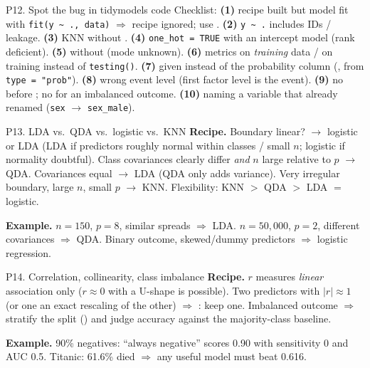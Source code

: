 \begin{topic}{P12. Spot the bug in tidymodels code }
Checklist: \textbf{(1)} recipe built but model fit with \texttt{fit(y \textasciitilde{} ., data)} $\Rightarrow$ recipe ignored;
use  \pipe{}  \pipe{} . \textbf{(2)} \texttt{y \textasciitilde{} .} includes IDs /
leakage. \textbf{(3)} KNN without . \textbf{(4)} \texttt{one\_hot = TRUE} with an intercept model
(rank deficient). \textbf{(5)}  without  (mode unknown). \textbf{(6)} metrics
on \emph{training} data /  on training instead of \texttt{testing()}. \textbf{(7)} 
given  instead of the probability column (, from \texttt{type = "prob"}).
\textbf{(8)} wrong event level (first factor level is the event). \textbf{(9)} no  before
; no  for an imbalanced outcome. \textbf{(10)}  naming a
variable that  already renamed (\texttt{sex} $\to$ \texttt{sex\_male}).
\end{topic}

\begin{topic}{P13. LDA vs.\ QDA vs.\ logistic vs.\ KNN }
\textbf{Recipe.} Boundary linear? $\to$ logistic or LDA (LDA if predictors roughly normal within classes / small $n$;
logistic if normality doubtful). Class covariances clearly differ \emph{and} $n$ large relative to $p$ $\to$ QDA.
Covariances equal $\to$ LDA (QDA only adds variance). Very irregular boundary, large $n$, small $p$ $\to$ KNN.
Flexibility: KNN $>$ QDA $>$ LDA $=$ logistic.
\par\textbf{Example.} $n=150$, $p=8$, similar spreads $\Rightarrow$ LDA. $n=50{,}000$, $p=2$, different
covariances $\Rightarrow$ QDA. Binary outcome, skewed/dummy predictors $\Rightarrow$ logistic regression.
\end{topic}

\begin{topic}{P14. Correlation, collinearity, class imbalance }
\textbf{Recipe.} $r$ measures \emph{linear} association only ($r\approx0$ with a U-shape is possible). Two predictors
with $|r|\approx1$ (or one an exact rescaling of the other) $\Rightarrow$ : keep one. Imbalanced
outcome $\Rightarrow$ stratify the split () and judge accuracy against the majority-class baseline.
\par\textbf{Example.} 90\% negatives: ``always negative'' scores  0.90 with sensitivity 0 and AUC 0.5.
Titanic: 61.6\% died $\Rightarrow$ any useful model must beat 0.616.
\end{topic}


